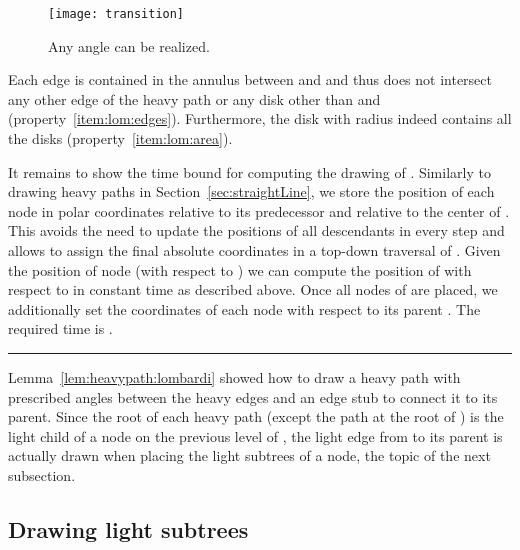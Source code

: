 \documentclass[11pt]{article}
\newcommand{\qed}{\hspace*{\fill}\rule{6pt}{6pt}}
\newenvironment{proof}{\noindent{\bf Proof:}}{\bigskip} \makeatletter
\begin{document}
\begin{proof}
  \begin{figure}[tbp]
  	\centering
  		\texttt{[image: transition]}
  	\caption{Any angle  can be realized.}
  	\label{fig:transition-angle}
  \end{figure}

 
  
  

  Each edge  is contained in the annulus between 
  and  and thus does not intersect any other edge of the
  heavy path or any disk other than  and 
  (property~\ref{item:lom:edges}). Furthermore, the disk  with
  radius  indeed contains all the disks  (property~\ref{item:lom:area}). 

	It remains to show the time bound for computing the drawing of .
	Similarly to drawing heavy paths in Section~\ref{sec:straightLine}, we store the position of each node  in polar coordinates relative to its predecessor and relative to the center  of . This avoids the need to update the positions of all descendants in every step and allows to assign the final absolute coordinates in a top-down traversal of .
	Given the position of node  (with respect to ) we can compute the position of  with respect to  in constant time as described above. 
	Once all nodes of  are placed, we additionally set the coordinates of each node  with respect to its parent . 
	The required time is .	
	\qed
\end{proof}

Lemma~\ref{lem:heavypath:lombardi} showed how to draw a heavy path 
with prescribed angles between the heavy edges and an edge stub to
connect it to its parent. Since the root  of each heavy path  (except the path
at the root of ) is the light child of a node on the previous
level of , the light edge
from  to its parent is actually drawn when placing the
light subtrees of a node, the topic of the next subsection.



\subsection{Drawing light subtrees}
\label{sec:light-children}
\end{document}
